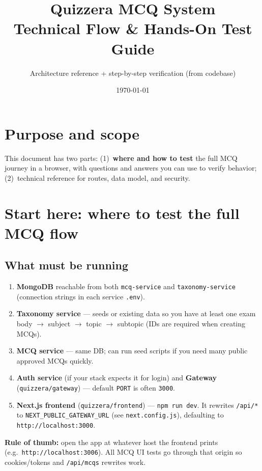 \documentclass[11pt,a4paper]{article}
\title{Quizzera MCQ System\\Technical Flow \& Hands-On Test Guide}
\author{Architecture reference + step-by-step verification (from codebase)}
\date{\today}
\begin{document}
\maketitle
\tableofcontents
\newpage

\section{Purpose and scope}

This document has two parts: (1)~\textbf{where and how to test} the full MCQ journey in a browser, with questions and answers you can use to verify behavior; (2)~technical reference for routes, data model, and security.

\section{Start here: where to test the full MCQ flow}

\subsection{What must be running}

\begin{enumerate}[leftmargin=*]
  \item \textbf{MongoDB} reachable from both \texttt{mcq-service} and \texttt{taxonomy-service} (connection strings in each service \texttt{.env}).
  \item \textbf{Taxonomy service} --- seeds or existing data so you have at least one exam body $\rightarrow$ subject $\rightarrow$ topic $\rightarrow$ subtopic (IDs are required when creating MCQs).
  \item \textbf{MCQ service} --- same DB; can run seed scripts if you need many public approved MCQs quickly.
  \item \textbf{Auth service} (if your stack expects it for login) and \textbf{Gateway} (\texttt{quizzera/gateway}) --- default \texttt{PORT} is often \texttt{3000}.
  \item \textbf{Next.js frontend} (\texttt{quizzera/frontend}) --- \texttt{npm run dev}. It rewrites \texttt{/api/*} to \texttt{NEXT\_PUBLIC\_GATEWAY\_URL} (see \texttt{next.config.js}), defaulting to \texttt{http://localhost:3000}.
\end{enumerate}

\textbf{Rule of thumb:} open the app at whatever host the frontend prints (e.g.\ \texttt{http://localhost:3006}). All MCQ UI tests go through that origin so cookies/tokens and \texttt{/api/mcqs} rewrites work.
\end{document}
